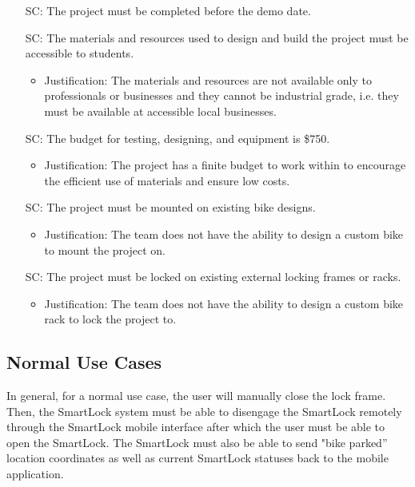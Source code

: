 \documentclass[12pt]{article}
\newcounter{scnum} %
\begin{document}
\begin{itemize}

\item[SC\refstepcounter{scnum}\thescnum\label{SC1}:] The project must be completed before the demo date.

\item[SC\refstepcounter{scnum}\thescnum\label{SC2}:] The materials and resources used to design and build the project must be accessible to students.
	\begin{itemize}
		\item Justification: The materials and resources are not available only to professionals or businesses and they cannot be industrial grade, i.e. they must be available at accessible local businesses.
	\end{itemize} 

\item[SC\refstepcounter{scnum}\thescnum\label{SC3}:] The budget for testing, designing, and equipment is \$750.
	\begin{itemize}
		\item Justification: The project has a finite budget to work within to encourage the efficient use of materials and ensure low costs.
	\end{itemize} 
	
\item[SC\refstepcounter{scnum}\thescnum\label{SC4}:]  The project must be mounted on existing bike designs.
	\begin{itemize}
		\item Justification: The team does not have the ability to design a custom bike to mount the project on. 
	\end{itemize} 	
	
\item[SC\refstepcounter{scnum}\thescnum\label{SC5}:] The project must be locked on existing external locking frames or racks.
	\begin{itemize}
		\item Justification: The team does not have the ability to design a custom bike rack to lock the project to. 
	\end{itemize} 

\end{itemize}

\subsection{Normal Use Cases}
In general, for a normal use case, the user will manually close the lock frame. Then, the SmartLock system must be able to disengage the SmartLock remotely through the SmartLock mobile interface after which the user must be able to open the SmartLock.  The SmartLock must also be able to send "bike parked” location coordinates as well as current SmartLock statuses back to the mobile application. 
\end{document}
